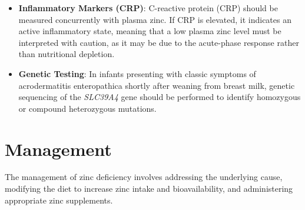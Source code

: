 \begin{itemize}
    \item \textbf{Inflammatory Markers (CRP)}: C-reactive protein (CRP) should be measured concurrently with plasma zinc. If CRP is elevated, it indicates an active inflammatory state, meaning that a low plasma zinc level must be interpreted with caution, as it may be due to the acute-phase response rather than nutritional depletion.
    \item \textbf{Genetic Testing}: In infants presenting with classic symptoms of acrodermatitis enteropathica shortly after weaning from breast milk, genetic sequencing of the \textit{SLC39A4} gene should be performed to identify homozygous or compound heterozygous mutations.
\end{itemize}

\section*{Management}
The management of zinc deficiency involves addressing the underlying cause, modifying the diet to increase zinc intake and bioavailability, and administering appropriate zinc supplements.


